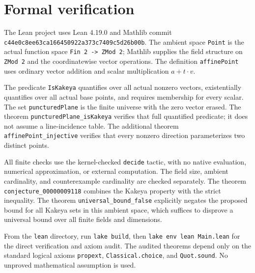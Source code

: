\documentclass[11pt]{article}
\begin{document}
\section{Formal verification}
\raggedright
The Lean project uses Lean 4.19.0 and Mathlib commit
\texttt{c44e0c8ee63ca166450922a373c7409c5d26b00b}.
The ambient space \texttt{Point} is the actual function space
\texttt{Fin 2 -> ZMod 2}; Mathlib supplies the field structure on
\texttt{ZMod 2} and the coordinatewise vector operations.
The definition \texttt{affinePoint} uses ordinary vector addition and
scalar multiplication $a+t\mathbin{\cdot}v$.

The predicate \texttt{IsKakeya} quantifies over all actual nonzero
vectors, existentially quantifies over all actual base points, and
requires membership for every scalar. The set
\texttt{puncturedPlane} is the finite universe with the zero vector
erased. The theorem \texttt{puncturedPlane\_isKakeya} verifies that
full quantified predicate; it does not assume a line-incidence table.
The additional theorem \texttt{affinePoint\_injective} verifies that
every nonzero direction parameterizes two distinct points.

All finite checks use the kernel-checked \texttt{decide} tactic, with
no native evaluation, numerical approximation, or external computation.
The field size, ambient cardinality, and counterexample cardinality
are checked separately. The theorem
\texttt{conjecture\_00000009118} combines the Kakeya property with
the strict inequality. The theorem \texttt{universal\_bound\_false}
explicitly negates the proposed bound for all Kakeya sets in this
ambient space, which suffices to disprove a universal bound over all
finite fields and dimensions.

From the \texttt{lean} directory, run \texttt{lake build}, then
\texttt{lake env lean Main.lean} for the direct verification and
axiom audit. The audited theorems depend only on the standard logical
axioms \texttt{propext}, \texttt{Classical.choice}, and
\texttt{Quot.sound}. No unproved mathematical assumption is used.
\end{document}

